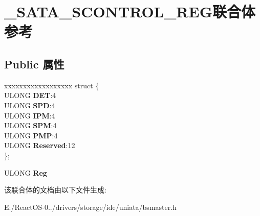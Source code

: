 \hypertarget{union___s_a_t_a___s_c_o_n_t_r_o_l___r_e_g}{}\section{\+\_\+\+S\+A\+T\+A\+\_\+\+S\+C\+O\+N\+T\+R\+O\+L\+\_\+\+R\+E\+G联合体 参考}
\label{union___s_a_t_a___s_c_o_n_t_r_o_l___r_e_g}
\subsection*{Public 属性}
\begin{DoxyCompactItemize}
\item 
\mbox{\label{union___s_a_t_a___s_c_o_n_t_r_o_l___r_e_g_ad39e96f4a10c4d549a20299c39e3918c}} 
\begin{tabbing}
xx\=xx\=xx\=xx\=xx\=xx\=xx\=xx\=xx\=\kill
struct \{\\
\>ULONG {\bfseries DET}:4\\
\>ULONG {\bfseries SPD}:4\\
\>ULONG {\bfseries IPM}:4\\
\>ULONG {\bfseries SPM}:4\\
\>ULONG {\bfseries PMP}:4\\
\>ULONG {\bfseries Reserved}:12\\
\}; \\

\end{tabbing}\item 
\mbox{\label{union___s_a_t_a___s_c_o_n_t_r_o_l___r_e_g_a67af08ad3957a5a030986cf0e4117e69}} 
U\+L\+O\+NG {\bfseries Reg}
\end{DoxyCompactItemize}


该联合体的文档由以下文件生成\+:\begin{DoxyCompactItemize}
\item 
E\+:/\+React\+O\+S-\/0../drivers/storage/ide/uniata/bsmaster.\+h\end{DoxyCompactItemize}
